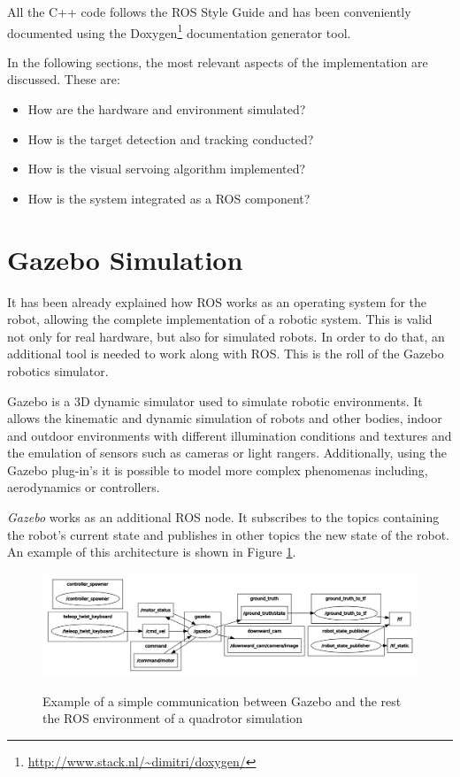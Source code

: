All the C++ code follows the ROS Style Guide \cite{ROS_Style} and has been conveniently documented using the Doxygen\footnote{\url{http://www.stack.nl/~dimitri/doxygen/}} documentation generator tool.

\pagebreak

In the following sections, the most relevant aspects of the implementation are discussed. These are: 

\begin{itemize}
	\item How are the hardware and environment simulated?
	
	\item How is the target detection and tracking conducted?
	
	\item How is the visual servoing algorithm implemented?
	
	\item How is the system integrated as a ROS component?
\end{itemize}


\section{Gazebo Simulation}
\label{sec:gazebo-simulation}

It has been already explained how ROS works as an operating system for the robot, allowing the complete implementation of a robotic system. This is valid not only for real hardware, but also for simulated robots. In order to do that, an additional tool is needed to work along with ROS. This is the roll of the Gazebo robotics simulator.

Gazebo is a 3D dynamic simulator used to simulate robotic environments. It allows the kinematic and dynamic simulation of robots and other bodies, indoor and outdoor environments with different illumination conditions and textures and the emulation of sensors such as cameras or light rangers. Additionally, using the Gazebo plug-in's it is possible to model more complex phenomenas including, aerodynamics or controllers.

\emph{Gazebo} works as an additional ROS node. It subscribes to the topics containing the robot's current state and publishes in other topics the new state of the robot. An example of this architecture is shown in Figure \ref{fig:gazebo_example}.

\begin{figure}[!htb]
	\caption{Example of a simple communication between Gazebo and the rest the ROS environment of a quadrotor simulation}
	\centering
	\includegraphics[width=\textwidth]{content/chapter_05/images/gazebo_example.png}
	\label{fig:gazebo_example}
\end{figure}

